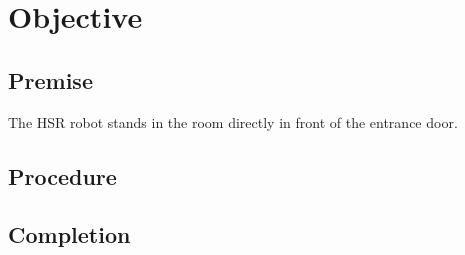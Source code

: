 \documentclass[main.tex]{subfiles}
\begin{document}
	
	\chapter{Objective}
	\section{Premise}
		The HSR robot stands in the room directly in front of the entrance door.
		
	\section{Procedure}
	
	\section{Completion}
\end{document}

